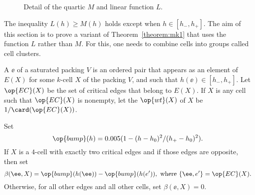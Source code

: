 \begin{figure}[htb]
\centering
{}
\caption{Detail of the quartic $M$ and linear function $L$.}
\label{fig:L}
\end{figure}

The inequality $L(h)\ge M(h)$ holds except when $h\in [h_-,h_+]$.  The
aim of this section is to prove a variant of Theorem~\ref{theorem:mk1}
that uses the function $L$ rather than $M$.  For this, one needs to
combine cells into groups called cell clusters.

\begin{definition}\label{def:wt} 
A  $\ee$ of a saturated packing $V$ is an ordered pair
that appears as an element of $E(X)$ for some 
$k$-cell $X$ of the packing $V$, and such that
$h(\ee)\in[h_-,h_+]$.  Let $\op{EC}(X)$ 
be the set of critical edges that belong to $E(X)$.  If $X$ is any cell such
that $\op{EC}(X)$ is nonempty, let the  $\op{wt}(X)$ of $X$ be
$1/\card(\op{EC}(X))$.
\end{definition}
%
%
%

\begin{definition}\label{def:beta} 
Set 
\begin{displaymath} 
\op{bump}(h) = 0.005 (1 - (h-h_0)^2/(h_+-h_0)^2).
\end{displaymath}
If $X$ is a $4$-cell with exactly two critical edges and if those edges
are opposite, then set
\begin{displaymath} 
\beta(\ee,X) = \op{bump}(h(\ee)) - \op{bump}(h(e')), \text{ where } \{\ee,e'\} = \op{EC}(X).  
\end{displaymath}
Otherwise, for all other edges and all other cells, set $\beta(\ee,X) = 0$.
\end{definition}
%
%

